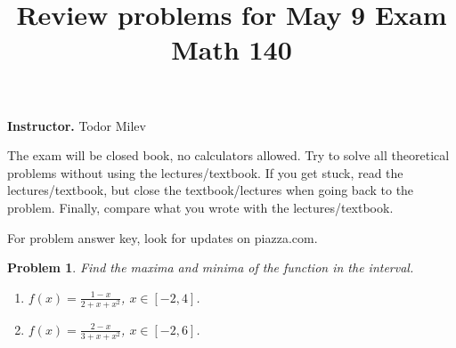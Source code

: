 \documentclass{article}
\title{
Review problems for May 9 Exam\\
Math 140 \\
}
\date{}
\newtheorem{problem}{Problem}
\begin{document}
\maketitle
\textbf{Instructor.} Todor Milev

The exam will be closed book, no calculators allowed. Try to solve all theoretical problems without using the lectures/textbook. If you get stuck, read the lectures/textbook, but close the textbook/lectures when going back to the problem. Finally, compare what you wrote with the lectures/textbook.

For problem answer key, look for updates on piazza.com.
\begin{problem} Find the maxima and minima of the function in the interval.
\begin{enumerate}
\item $f(x)=\frac{1-x}{2+x+x^{2}}$, $x\in [-2, 4]$. \hfill{~}  
\item $f(x)=\frac{2-x}{3+x+x^{2}} $, $x\in [-2, 6]$. \hfill{~}  
\end{enumerate}
\end{problem}
\end{document}
